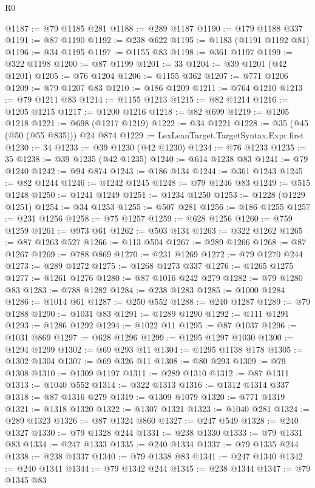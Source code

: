 \begin{lexlean}{R0}
\begin{coremodule}
@1187 := @79 @1185 @281
@1188 := @289 @1187
@1190 := @179 @1188 @337
@1191 := @87 @1190
@1192 := @238 @622
@1195 := @1183 (@1191 @1192 @81)
@1196 := @34 @1195
@1197 := @1155 @83
@1198 := @361 @1197
@1199 := @322 @1198
@1200 := @87 @1199
@1201 := 33
@1204 := @39 @1201 (@42 @1201)
@1205 := @76 @1204
@1206 := @1155 @362
@1207 := @771 @1206
@1209 := @79 @1207 @83
@1210 := @186 @1209
@1211 := @764 @1210
@1213 := @79 @1211 @83
@1214 := @1155 @1213
@1215 := @82 @1214
@1216 := @1205 @1215
@1217 := @1200 @1216
@1218 := @82 @699
@1219 := @1205 @1218
@1221 := @698 (@1217 @1219)
@1222 := @34 @1221
@1228 := @35 (@45 (@50 (@55 @835))) @24 @874
@1229 := LexLeanTarget.TargetSyntax.Expr.first
@1230 := 34
@1233 := @39 @1230 (@42 @1230)
@1234 := @76 @1233
@1235 := 35
@1238 := @39 @1235 (@42 @1235)
@1240 := @614 @1238 @83
@1241 := @79 @1240
@1242 := @94 @874
@1243 := @186 @134
@1244 := @361 @1243
@1245 := @82 @1244
@1246 := @1242 @1245
@1248 := @79 @1246 @83
@1249 := @515 @1248
@1250 := @1241 @1249
@1251 := @1234 @1250
@1253 := @1228 (@1229 @1251)
@1254 := @34 @1253
@1255 := @507 @281
@1256 := @186 @1255
@1257 := @231 @1256
@1258 := @75 @1257
@1259 := @628 @1256
@1260 := @759 @1259
@1261 := @973 @61
@1262 := @503 @134
@1263 := @322 @1262
@1265 := @87 @1263 @527
@1266 := @113 @504
@1267 := @289 @1266
@1268 := @87 @1267
@1269 := @788 @869
@1270 := @231 @1269
@1272 := @79 @1270 @244
@1273 := @289 @1272
@1275 := @1268 @1273 @337
@1276 := @1265 @1275
@1277 := @1261 @1276
@1280 := @87 @1016 @242 @279
@1282 := @79 @1280 @83
@1283 := @788 @1282
@1284 := @238 @1283
@1285 := @1000 @1284
@1286 := @1014 @61
@1287 := @250 @552
@1288 := @240 @1287
@1289 := @79 @1288
@1290 := @1031 @83
@1291 := @1289 @1290
@1292 := @111 @1291
@1293 := @1286 @1292
@1294 := @1022 @11
@1295 := @87 @1037
@1296 := @1031 @869
@1297 := @628 @1296
@1299 := @1295 @1297 @1030
@1300 := @1294 @1299
@1302 := @69 @293 @11
@1304 := @1295 @1138 @178
@1305 := @1302 @1304
@1307 := @69 @326 @11
@1308 := @80 @293
@1309 := @79 @1308
@1310 := @1309 @1197
@1311 := @289 @1310
@1312 := @87 @1311
@1313 := @1040 @552
@1314 := @322 @1313
@1316 := @1312 @1314 @337
@1318 := @87 @1316 @279
@1319 := @1309 @1079
@1320 := @771 @1319
@1321 := @1318 @1320
@1322 := @1307 @1321
@1323 := @1040 @281
@1324 := @289 @1323
@1326 := @87 @1324 @860
@1327 := @247 @549
@1328 := @240 @1327
@1330 := @79 @1328 @244
@1331 := @238 @1330
@1333 := @79 @1331 @83
@1334 := @247 @1333
@1335 := @240 @1334
@1337 := @79 @1335 @244
@1338 := @238 @1337
@1340 := @79 @1338 @83
@1341 := @247 @1340
@1342 := @240 @1341
@1344 := @79 @1342 @244
@1345 := @238 @1344
@1347 := @79 @1345 @83

\end{coremodule}
\end{lexlean}

